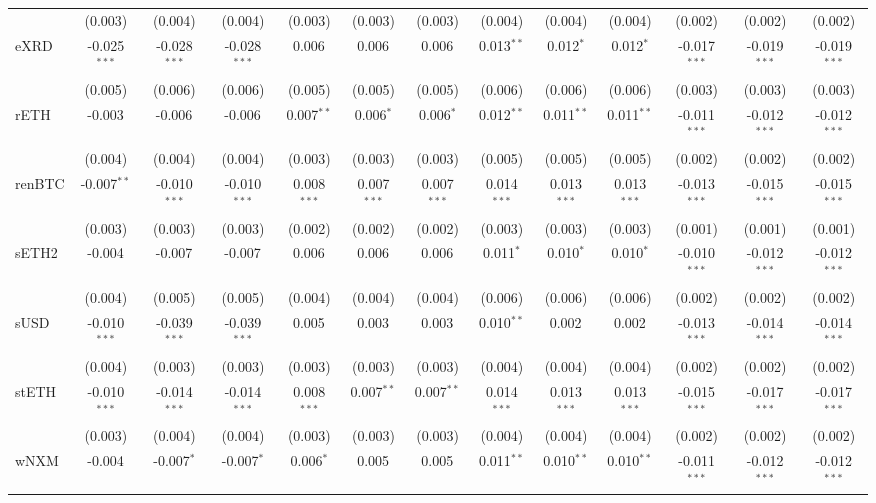 \begin{table}[!htbp]
\begin{tabular}{@{\extracolsep{5pt}}lcccccccccccc}
  & (0.003) & (0.004) & (0.004) & (0.003) & (0.003) & (0.003) & (0.004) & (0.004) & (0.004) & (0.002) & (0.002) & (0.002) \\
 eXRD & -0.025$^{***}$ & -0.028$^{***}$ & -0.028$^{***}$ & 0.006$^{}$ & 0.006$^{}$ & 0.006$^{}$ & 0.013$^{**}$ & 0.012$^{*}$ & 0.012$^{*}$ & -0.017$^{***}$ & -0.019$^{***}$ & -0.019$^{***}$ \\
  & (0.005) & (0.006) & (0.006) & (0.005) & (0.005) & (0.005) & (0.006) & (0.006) & (0.006) & (0.003) & (0.003) & (0.003) \\
 rETH & -0.003$^{}$ & -0.006$^{}$ & -0.006$^{}$ & 0.007$^{**}$ & 0.006$^{*}$ & 0.006$^{*}$ & 0.012$^{**}$ & 0.011$^{**}$ & 0.011$^{**}$ & -0.011$^{***}$ & -0.012$^{***}$ & -0.012$^{***}$ \\
  & (0.004) & (0.004) & (0.004) & (0.003) & (0.003) & (0.003) & (0.005) & (0.005) & (0.005) & (0.002) & (0.002) & (0.002) \\
 renBTC & -0.007$^{**}$ & -0.010$^{***}$ & -0.010$^{***}$ & 0.008$^{***}$ & 0.007$^{***}$ & 0.007$^{***}$ & 0.014$^{***}$ & 0.013$^{***}$ & 0.013$^{***}$ & -0.013$^{***}$ & -0.015$^{***}$ & -0.015$^{***}$ \\
  & (0.003) & (0.003) & (0.003) & (0.002) & (0.002) & (0.002) & (0.003) & (0.003) & (0.003) & (0.001) & (0.001) & (0.001) \\
 sETH2 & -0.004$^{}$ & -0.007$^{}$ & -0.007$^{}$ & 0.006$^{}$ & 0.006$^{}$ & 0.006$^{}$ & 0.011$^{*}$ & 0.010$^{*}$ & 0.010$^{*}$ & -0.010$^{***}$ & -0.012$^{***}$ & -0.012$^{***}$ \\
  & (0.004) & (0.005) & (0.005) & (0.004) & (0.004) & (0.004) & (0.006) & (0.006) & (0.006) & (0.002) & (0.002) & (0.002) \\
 sUSD & -0.010$^{***}$ & -0.039$^{***}$ & -0.039$^{***}$ & 0.005$^{}$ & 0.003$^{}$ & 0.003$^{}$ & 0.010$^{**}$ & 0.002$^{}$ & 0.002$^{}$ & -0.013$^{***}$ & -0.014$^{***}$ & -0.014$^{***}$ \\
  & (0.004) & (0.003) & (0.003) & (0.003) & (0.003) & (0.003) & (0.004) & (0.004) & (0.004) & (0.002) & (0.002) & (0.002) \\
 stETH & -0.010$^{***}$ & -0.014$^{***}$ & -0.014$^{***}$ & 0.008$^{***}$ & 0.007$^{**}$ & 0.007$^{**}$ & 0.014$^{***}$ & 0.013$^{***}$ & 0.013$^{***}$ & -0.015$^{***}$ & -0.017$^{***}$ & -0.017$^{***}$ \\
  & (0.003) & (0.004) & (0.004) & (0.003) & (0.003) & (0.003) & (0.004) & (0.004) & (0.004) & (0.002) & (0.002) & (0.002) \\
 wNXM & -0.004$^{}$ & -0.007$^{*}$ & -0.007$^{*}$ & 0.006$^{*}$ & 0.005$^{}$ & 0.005$^{}$ & 0.011$^{**}$ & 0.010$^{**}$ & 0.010$^{**}$ & -0.011$^{***}$ & -0.012$^{***}$ & -0.012$^{***}$ \\

\end{tabular}
\end{table}
